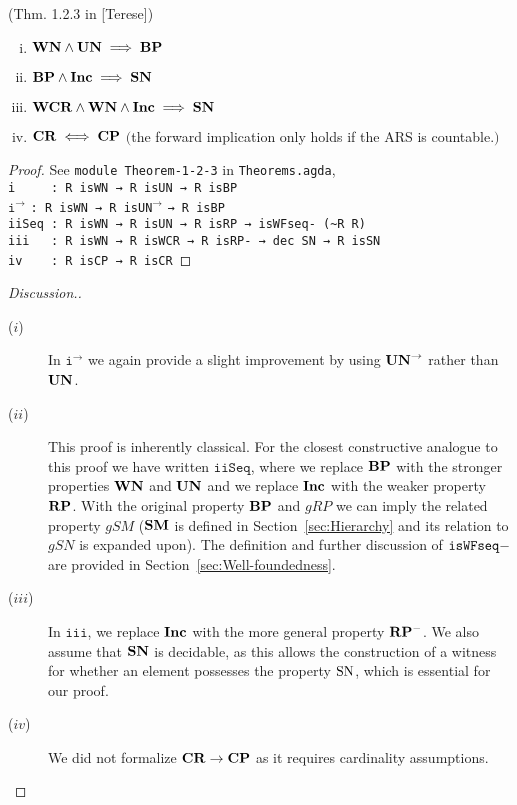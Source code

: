 \begin{theorem}(Thm. 1.2.3 in [Terese])
  \begin{enumerate}[(i)]
    \item $\mathbf{WN} \land \mathbf{UN} \implies \mathbf{BP}$
    \item $\mathbf{BP} \land \mathbf{Inc} \implies \mathbf{SN}$
    \item $\mathbf{WCR} \land \mathbf{WN} \land \mathbf{Inc} \implies \mathbf{SN}$
    \item $\mathbf{CR} \iff \mathbf{CP}$ $($the forward implication only holds if the ARS is countable.$)$
  \end{enumerate}
\end{theorem}

\begin{proof}
    See \texttt{module Theorem-1-2-3} in \texttt{Theorems.agda},\\
    \verb|i     : R isWN → R isUN → R isBP|\\
    $\mathtt{i^\to}$\hspace{5mm} \verb|: R isWN → R |\texttt{isUN}$^{\to}$ \verb|→ R isBP|\\
    \verb|iiSeq : R isWN → R isUN → R isRP → isWFseq- (~R R)|\\
    \verb|iii   : R isWN → R isWCR → R isRP- → dec SN → R isSN|\\
    \verb|iv    : R isCP → R isCR|
\end{proof}
\begin{proof}[Discussion.]\hfill
  \begin{description}
    \item[($i$)] In $\mathtt{i^\to}$ we again provide a slight improvement by using $\mathbf{UN}^{\to}$ rather than $\mathbf{UN}$.
    \item[($ii$)] This proof is inherently classical. For the closest constructive analogue to this proof we have written $\mathtt{iiSeq}$, where we replace $\mathbf{BP}$ with the stronger properties $\mathbf{WN}$ and $\mathbf{UN}$ and we replace $\mathbf{Inc}$ with the weaker property $\mathbf{RP}$. 
    With the original property $\mathbf{BP}$ and $gRP$ we can imply the related property $gSM$ ($\mathbf{SM}$ is defined in Section~\ref{sec:Hierarchy} and its relation to $gSN$ is expanded upon). The definition and further discussion of $\mathtt{isWFseq-}$ are provided in Section~\ref{sec:Well-foundedness}.
    \item[($iii$)] In $\mathtt{iii}$, we replace $\mathbf{Inc}$ with the more general property $\mathbf{RP^{-}}$. We also assume that $\mathbf{SN}$ is decidable, as this allows the construction of a witness for whether an element possesses the property $\mathrm{SN}$, which is essential for our proof.
    \item[($iv$)] We did not formalize $\mathbf{CR} \to \mathbf{CP}$ as it requires cardinality assumptions. \qedhere
  \end{description}
\end{proof}

